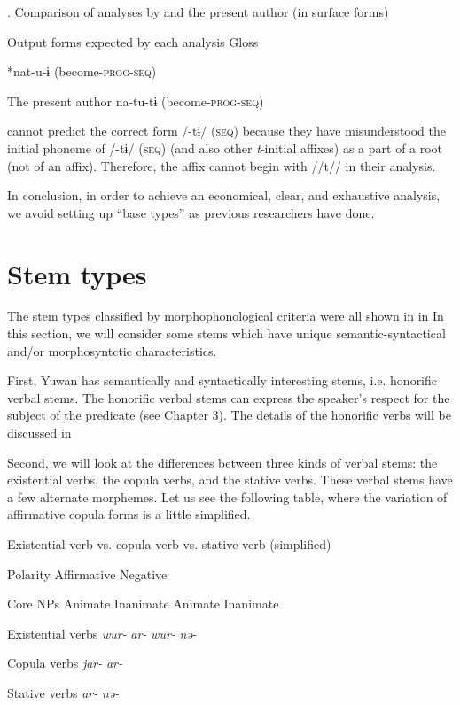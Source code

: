 \begin{table}
\caption{\label{tab:key:70}. Comparison of analyses by \citet{UchimaEtAl1976} and the present author (in surface forms)}

  Output forms expected by each analysis  Gloss

\citet{UchimaEtAl1976}  *nat-u-ɨ  (become-\textsc{prog}-\textsc{seq})

The present author  na-tu-tɨ  (become-\textsc{prog}-\textsc{seq})
\end{table}

\citet{UchimaEtAl1976} cannot predict the correct form /-tɨ/ (\textsc{seq}) because they have misunderstood the initial phoneme of /-tɨ/ (\textsc{seq}) (and also other \textit{t}{}-initial affixes) as a part of a root (not of an affix). Therefore, the affix cannot begin with //t// in their analysis.

  In conclusion, in order to achieve an economical, clear, and exhaustive analysis, we avoid setting up “base types” as previous researchers have done.

\section{Stem types}

The stem types classified by morphophonological criteria were all shown in  in  In this section, we will consider some stems which have unique semantic-syntactical and/or morphosyntctic characteristics.

  First, Yuwan has semantically and syntactically interesting stems, i.e. honorific verbal stems. The honorific verbal stems can express the speaker’s respect for the subject of the predicate (see Chapter 3). The details of the honorific verbs will be discussed in 

  Second, we will look at the differences between three kinds of verbal stems: the existential verbs, the copula verbs, and the stative verbs. These verbal stems have a few alternate morphemes. Let us see the following table, where the variation of affirmative copula forms is a little simplified.

\begin{table}
\caption{\label{tab:key:71}Existential verb vs. copula verb vs. stative verb (simplified)}

Polarity  Affirmative  Negative

Core NPs  Animate  Inanimate  Animate  Inanimate

Existential verbs  \textit{wur-}  \textit{ar-}  \textit{wur-}  \textit{nə-}

Copula verbs  \textit{jar-}  \textit{ar-}

Stative verbs  \textit{ar-}  \textit{nə-}
\end{table}

